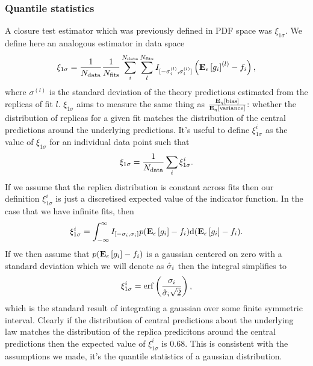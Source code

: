 \subsubsection{Quantile statistics}

A closure test estimator which was previously defined in PDF space was $\xi_{1\sigma}$.
We define here an analogous estimator in data space
\begin{equation}
    \xi_{1\sigma} = \frac{1}{N_{\rm data}} \frac{1}{N_{\rm fits}} \sum_{i}^{N_{\rm data}} \sum_{l}^{N_{\rm fits}}
    I_{[-\sigma_i^{(l)}, \sigma_i^{(l)}]}
    \left( \mathbf{E}_{\epsilon}\left[ g_i \right]^{(l)} - f_i \right),
\end{equation}
where $\sigma^{(l)}$ is the standard deviation of the theory predictions
estimated from the replicas of fit $l$. $\xi_{1\sigma}$ aims to measure the same
thing as $\frac{\mathbf{E}_{\eta}\left[ {\rm bias} \right]}{\mathbf{E}_{\eta}\left[ {\rm variance} \right]}$: whether the distribution of
replicas for a given fit matches the distribution of the central predictions
around the underlying predictions. It's useful to define $\xi_{1\sigma}^{i}$ as
the value of $\xi_{1\sigma}$ for an individual data point
such that
\begin{equation}
    \xi_{1\sigma} = \frac{1}{N_{\rm data}} \sum_i \xi_{1\sigma}^{i}.
\end{equation}
If we assume that
the replica distribution is constant across
fits then our definition $\xi_{1\sigma}^{i}$ is just a discretised expected value
of the indicator function. In the case that we have infinite fits, then
\begin{equation}
    \xi_{1\sigma}^{i} = \int_{-\infty}^{\infty} I_{[-\sigma_i, \sigma_i]}
    p(\mathbf{E}_{\epsilon}\left[ g_i \right] - f_i)
    {\rm d}(\mathbf{E}_{\epsilon}\left[ g_i \right] - f_i).
\end{equation}
If we then assume that $p(\mathbf{E}_{\epsilon}\left[ g_i \right] - f_i)$ is a gaussian centered on zero
with a standard deviation which we will denote as $\hat{\sigma}_i$ then the integral
simplifies to
\begin{equation}
    \xi_{1\sigma}^{i} = {\rm erf} \left( \frac{\sigma_i}{\hat{\sigma}_i \sqrt{2}}\right),
    \label{eq:expectedxi}
\end{equation}
which is the standard result of integrating a gaussian over some finite symmetric
interval. Clearly if the distribution of central predictions about the underlying law
matches the distribution of the replica predicitons around the central predictions
then the expected value of $\xi_{1\sigma}^{i}$ is 0.68. This is consistent with
the assumptions we made, it's the quantile statistics of a gaussian distribution.

